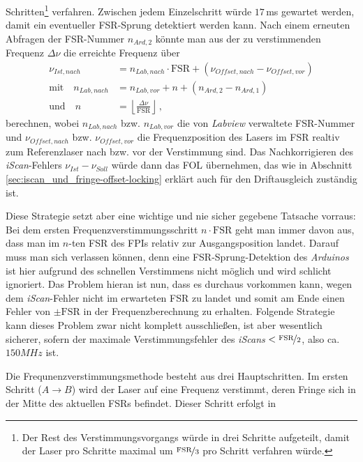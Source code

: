Schritten\footnote{Der Rest des Verstimmungsvorgangs würde in drei Schritte
aufgeteilt, damit der Laser pro Schritte maximal um $\nicefrac{\text{FSR}}{3}$
pro Schritt verfahren würde.} verfahren. Zwischen jedem Einzelschritt würde
$17\,$ms gewartet werden, damit ein eventueller FSR-Sprung detektiert werden
kann.
Nach einem erneuten Abfragen der FSR-Nummer $n_{Ard,2}$ könnte man aus der zu
verstimmenden Frequenz $\Delta\nu$ die erreichte Frequenz über
\begin{equation}\label{eq:neue_frequenz_strategie_1}
	\begin{split}
		\nu_{Ist,nach} &=
		n_{Lab,nach}\cdot\text{FSR}+(\nu_{Offset,nach}-\nu_{Offset,vor})\\
		\text{mit}\quad
		n_{Lab,nach} &= n_{Lab,vor}+n+(n_{Ard,2}-n_{Ard,1})\\
		\text{und}\quad
		n &= \left\lfloor\frac{\Delta\nu}{\text{FSR}}\right\rfloor\,,
	\end{split}
\end{equation}
berechnen, wobei $n_{Lab,nach}$ bzw. $n_{Lab,vor}$ die von \textit{Labview}
verwaltete FSR-Nummer und $\nu_{Offset,nach}$ bzw. $\nu_{Offset,vor}$ die
Frequenzposition des Lasers im FSR realtiv zum Referenzlaser nach bzw. vor der
Verstimmung sind. Das Nachkorrigieren des \textit{iScan}-Fehlers
$\nu_{Ist}-\nu_{Soll}$ würde dann das FOL übernehmen, das wie in Abschnitt
\ref{sec:iscan_und_fringe-offset-locking} erklärt auch für den Driftausgleich
zuständig ist.\par
Diese Strategie setzt aber eine wichtige und nie sicher gegebene Tatsache
vorraus: Bei dem ersten Frequenzverstimmungsschritt $n\cdot\text{FSR}$ geht man
immer davon aus, dass man im $n$-ten FSR des FPIs relativ zur Ausgangsposition
landet. Darauf muss man sich verlassen können, denn eine FSR-Sprung-Detektion
des \textit{Arduinos} ist hier aufgrund des schnellen Verstimmens nicht möglich
und wird schlicht ignoriert. Das Problem hieran ist nun, dass es durchaus vorkommen kann,
wegen dem \textit{iScan}-Fehler nicht im erwarteten FSR zu landet und somit am
Ende einen Fehler von $\pm\text{FSR}$ in der Frequenzberechnung zu erhalten.
Folgende Strategie kann dieses Problem zwar nicht komplett ausschließen, ist aber
wesentlich sicherer, sofern der maximale Verstimmungsfehler des \textit{iScans}
$<\nicefrac{\text{FSR}}{2}$, also ca. $150MHz$ ist.\par
Die Frequnenzverstimmungsmethode besteht aus drei Hauptschritten. Im ersten
Schritt ($A\rightarrow B$) wird der Laser auf eine Frequenz verstimmt, deren
Fringe sich in der Mitte des aktuellen FSRs befindet. Dieser Schritt erfolgt in
